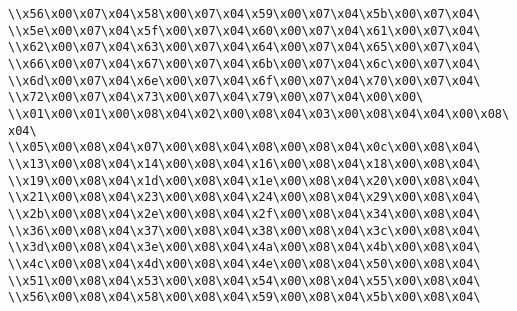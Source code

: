 \verb|\\x56\x00\x07\x04\x58\x00\x07\x04\x59\x00\x07\x04\x5b\x00\x07\x04\|\newline
\verb|\\x5e\x00\x07\x04\x5f\x00\x07\x04\x60\x00\x07\x04\x61\x00\x07\x04\|\newline
\verb|\\x62\x00\x07\x04\x63\x00\x07\x04\x64\x00\x07\x04\x65\x00\x07\x04\|\newline
\verb|\\x66\x00\x07\x04\x67\x00\x07\x04\x6b\x00\x07\x04\x6c\x00\x07\x04\|\newline
\verb|\\x6d\x00\x07\x04\x6e\x00\x07\x04\x6f\x00\x07\x04\x70\x00\x07\x04\|\newline
\verb|\\x72\x00\x07\x04\x73\x00\x07\x04\x79\x00\x07\x04\x00\x00\|\newline
\verb|\\x01\x00\x01\x00\x08\x04\x02\x00\x08\x04\x03\x00\x08\x04\x04\x00\x08\x04\|\newline
\verb|\\x05\x00\x08\x04\x07\x00\x08\x04\x08\x00\x08\x04\x0c\x00\x08\x04\|\newline
\verb|\\x13\x00\x08\x04\x14\x00\x08\x04\x16\x00\x08\x04\x18\x00\x08\x04\|\newline
\verb|\\x19\x00\x08\x04\x1d\x00\x08\x04\x1e\x00\x08\x04\x20\x00\x08\x04\|\newline
\verb|\\x21\x00\x08\x04\x23\x00\x08\x04\x24\x00\x08\x04\x29\x00\x08\x04\|\newline
\verb|\\x2b\x00\x08\x04\x2e\x00\x08\x04\x2f\x00\x08\x04\x34\x00\x08\x04\|\newline
\verb|\\x36\x00\x08\x04\x37\x00\x08\x04\x38\x00\x08\x04\x3c\x00\x08\x04\|\newline
\verb|\\x3d\x00\x08\x04\x3e\x00\x08\x04\x4a\x00\x08\x04\x4b\x00\x08\x04\|\newline
\verb|\\x4c\x00\x08\x04\x4d\x00\x08\x04\x4e\x00\x08\x04\x50\x00\x08\x04\|\newline
\verb|\\x51\x00\x08\x04\x53\x00\x08\x04\x54\x00\x08\x04\x55\x00\x08\x04\|\newline
\verb|\\x56\x00\x08\x04\x58\x00\x08\x04\x59\x00\x08\x04\x5b\x00\x08\x04\|\newline
